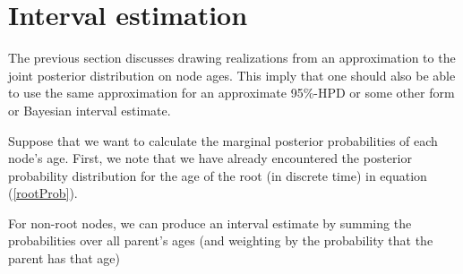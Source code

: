 \documentclass{llncs}
\begin{document}
\section{Interval estimation}
The previous section discusses drawing realizations from an approximation to the joint posterior distribution on node ages.
This imply that one should also be able to use the same approximation for an approximate 95\%-HPD or some other
    form or Bayesian interval estimate.

Suppose that we want to calculate the marginal posterior probabilities of each node's age.
First, we note that we have already encountered the posterior probability distribution for the age
    of the root (in discrete time) in equation (\ref{rootProb}).

For non-root nodes, we can produce an interval estimate by summing the probabilities over
    all parent's ages (and weighting by the probability that the parent has that age)
\newpage
\end{document}

